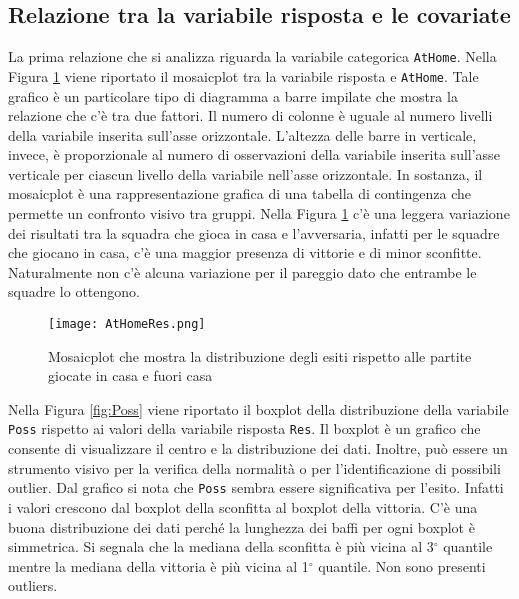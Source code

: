 \subsection{Relazione tra la variabile risposta e le covariate}

La prima relazione che si analizza riguarda la variabile categorica \texttt{AtHome}. Nella Figura \ref{fig:AtHome} viene riportato il mosaicplot tra la variabile risposta e \texttt{AtHome}. Tale grafico è un particolare tipo di diagramma a barre impilate che mostra la relazione che c'è tra due fattori. Il numero di colonne è uguale al numero livelli della variabile inserita sull'asse orizzontale. L'altezza delle barre in verticale, invece, è proporzionale al numero di osservazioni della variabile inserita sull'asse verticale per ciascun livello della variabile nell'asse orizzontale.
In sostanza, il mosaicplot è una rappresentazione grafica di una tabella di contingenza che permette un confronto visivo tra gruppi. Nella Figura \ref{fig:AtHome} c'è una leggera variazione dei risultati tra la squadra che gioca in casa e l'avversaria, infatti per le squadre che giocano in casa, c'è una maggior presenza di vittorie e di minor sconfitte. Naturalmente non c'è alcuna variazione per il pareggio dato che entrambe le squadre lo ottengono.

\begin{figure}[htbp]
	\begin{center}
		\texttt{[image: AtHomeRes.png]}
		\caption{Mosaicplot che mostra la distribuzione degli esiti rispetto alle partite giocate in casa e fuori casa} \label{fig:AtHome}
	\end{center}
\end{figure}

Nella Figura \ref{fig:Poss} viene riportato il boxplot della distribuzione della variabile \texttt{Poss} rispetto ai valori della variabile risposta \texttt{Res}. Il boxplot è un grafico che consente di visualizzare il centro e la distribuzione dei dati. Inoltre, può essere un strumento visivo per la verifica della normalità o per l'identificazione di possibili outlier. Dal grafico si nota che \texttt{Poss} sembra essere significativa per l'esito. Infatti i valori crescono dal boxplot della sconfitta al boxplot della vittoria. C'è una buona distribuzione dei dati perché la lunghezza dei baffi per ogni boxplot è simmetrica. Si segnala che la mediana della sconfitta è più vicina al 3$^{\circ}$ quantile mentre la mediana della vittoria è più vicina al 1$^{\circ}$ quantile. Non sono presenti outliers.\\

